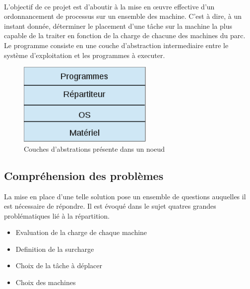     \paragraph{}
    L'objectif de ce projet est d'aboutir à la mise en \oe{}uvre
    effective d'un ordonnancement de processus sur un ensemble des
    machine. C'est à dire, à un instant donnée, déterminer le
    placement d'une tâche sur la machine la plus capable de la traiter
    en fonction de la charge de chacune des machines du parc. Le
    programme consiste en une couche d'abstraction intermediaire entre
    le système d'exploitation et les programmes à executer.
        
    \begin{figure}[h!]
      \centering
      \includegraphics[width=0.58\textwidth]{img/couches_du_systeme.png}
      \caption{Couches d'abstrations présente dans un noeud}
    \end{figure}
    
  \subsection{Compréhension des problèmes}
    
    La mise en place d'une telle solution pose un ensemble de
    questions auquelles il est nécessaire de répondre. Il est évoqué
    dans le sujet quatres grandes problématiques lié à la répartition.

    \begin{itemize}
      \item Evaluation de la charge de chaque machine
      \item Definition de la surcharge
      \item Choix de la tâche à déplacer 
      \item Choix des machines
    \end{itemize}

